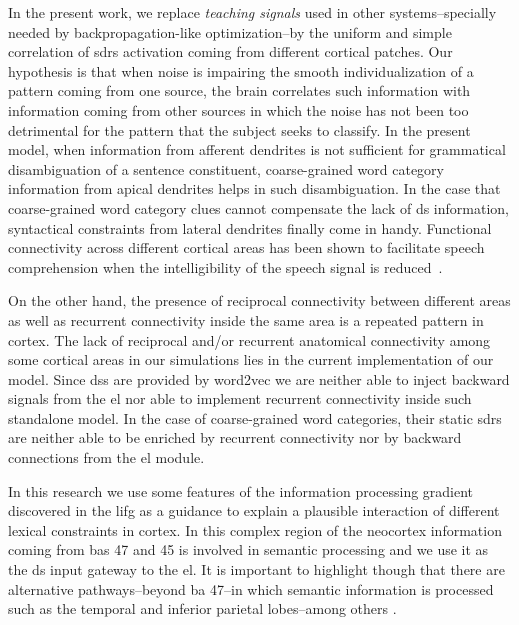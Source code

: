 {In the present work, we replace \emph{teaching signals} used in other systems--specially needed by backpropagation-like optimization--by the uniform and simple correlation of \glspl{sdr} activation coming from different cortical patches. Our hypothesis is that when noise is impairing the smooth individualization of a pattern coming from one source, the brain correlates such information with information coming from other sources in which the noise has not been too detrimental for the pattern that the subject seeks to classify.
In the present model, when  information from afferent dendrites is not sufficient for grammatical disambiguation of a sentence constituent, coarse-grained word category information from apical dendrites helps in such disambiguation. In the case that coarse-grained word category clues cannot compensate the lack of \gls{ds} information, syntactical constraints from lateral dendrites finally come in handy. Functional connectivity across different cortical areas has been shown to facilitate speech comprehension when the intelligibility of the speech signal is reduced~\cite{Obleser2283}.

On the other hand, the presence of reciprocal connectivity between different areas as well as recurrent connectivity inside the same area is a repeated pattern in cortex. The lack of reciprocal and/or recurrent anatomical connectivity among some cortical areas in our simulations lies in the current implementation of our model. Since \glspl{ds} are provided by word2vec we are neither able to inject backward signals from the \gls{el} nor able to implement recurrent connectivity inside such standalone model. In the case of coarse-grained word categories, their static \glspl{sdr} are neither able to be enriched by recurrent connectivity nor by backward connections from the \gls{el} module.

In this research we use some features of the information processing gradient discovered in the \gls{lifg} as a guidance to explain a plausible interaction of different lexical constraints in cortex. In this complex region of the neocortex information coming from \glspl{ba} 47 and 45 is involved in semantic processing \cite{GOUCHA2015294, DECARLI2007933, PMID:15528098, NEWMAN201051} and we use it as the \gls{ds} input gateway to the \gls{el}.
It is important to highlight though that there are alternative pathways--beyond \gls{ba} 47--in which semantic information is processed
such as the temporal and inferior parietal lobes--among others \cite{Binder2011TheNO}.

}

